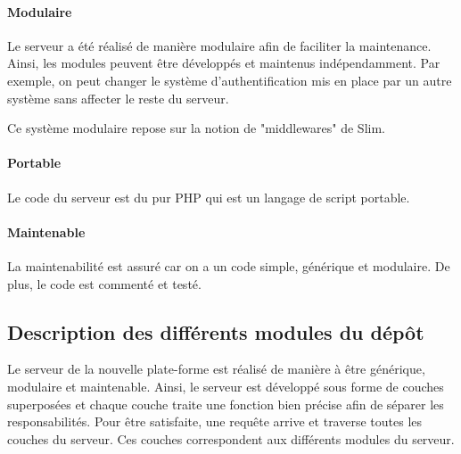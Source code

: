 \documentclass{report}
\begin{document}
\paragraph{Modulaire}
Le serveur a été réalisé de manière modulaire afin de faciliter la maintenance. Ainsi, les modules peuvent être développés
et maintenus indépendamment. Par exemple, on peut changer le système d'authentification mis en place par un autre
système sans affecter le reste du serveur.

Ce système modulaire repose sur la notion de "middlewares" de Slim.

\paragraph{Portable}
Le code du serveur est du pur PHP qui est un langage de script portable.

\paragraph{Maintenable}
La maintenabilité est assuré car on a un code simple, générique et modulaire.
De plus, le code est commenté et testé.


\subsection{Description des différents modules du dépôt}

Le serveur de la nouvelle plate-forme est réalisé de manière à être générique, modulaire et maintenable. Ainsi, le serveur 
est développé sous forme de couches superposées et chaque couche traite une fonction bien précise afin de séparer
les responsabilités. Pour être satisfaite, une requête arrive et traverse toutes les couches du serveur. Ces couches correspondent aux différents modules du serveur. 
\end{document}
